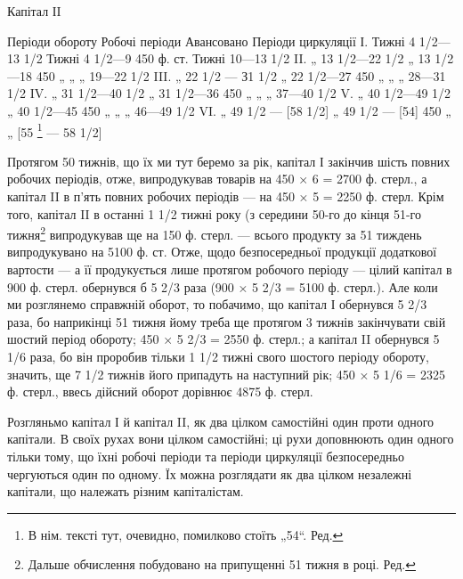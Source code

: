Капітал ІI

Періоди обороту    Робочі періоди    Авансовано    Періоди циркуляції
І. Тижні 4 1/2—13 1/2  Тижні 4 1/2—9    450 ф. ст. Тижні 10—13 1/2
II. „ 13 1/2—22 1/2 „ 13 1/2—18    450 „ „ „ 19—22 1/2
III. „ 22 1/2 — З1 1/2 „ 22 1/2—27    450 „ „ „ 28—31 1/2
IV. „ 31 1/2—40 1/2 „ 31  1/2—36    450 „ „ „ 37—40 1/2
V. „ 40 1/2—49 1/2 „ 40 1/2—45    450 „ „ „ 46—49 1/2
VI. „ 49 1/2 — [58 1/2]  „ 49 1/2 — [54] 450 „ „ [55 \footnote*{
В нім. тексті тут, очевидно, помилково стоїть „54“. Ред.
} — 58 1/2]

Протягом 50 тижнів, що їх ми тут беремо за рік, капітал І закінчив
шість повних робочих періодів, отже, випродукував товарів на 450 × 6
= 2700 ф. стерл., а капітал II в п’ять повних робочих періодів — на
450 × 5 = 2250 ф. стерл. Крім того, капітал II в останні 1 1/2 тижні року
(з середини 50-го до кінця 51-го тижня\footnote*{
Дальше обчислення побудовано на припущенні 51 тижня в році. Ред.
} випродукував ще на 150 ф.
стерл. — всього продукту за 51 тиждень випродукувано на 5100 ф. ст.
Отже, щодо безпосередньої продукції додаткової вартости — а її продукується
лише протягом робочого періоду — цілий капітал в 900 ф. стерл. обернувся
б 5 2/3 раза (900 × 5 2/3 = 5100 ф. стерл.). Але коли ми розглянемо
справжній оборот, то побачимо, що капітал І обернувся 5 2/3 раза, бо
наприкінці 51 тижня йому треба ще протягом 3 тижнів закінчувати
свій шостий період обороту; 450 × 5 2/3 = 2550 ф. стерл.; а капітал
II обернувся 5 1/6 раза, бо він проробив тільки 1 1/2 тижні свого
шостого періоду обороту, значить, ще 7 1/2 тижнів його припадуть на
наступний рік; 450 × 5 1/6 = 2325 ф. стерл., ввесь дійсний оборот дорівнює
4875 ф. стерл.

Розгляньмо капітал І й капітал II, як два цілком самостійні один проти
одного капітали. В своїх рухах вони цілком самостійні; ці рухи доповнюють
один одного тільки тому, що їхні робочі періоди та періоди
циркуляції безпосередньо чергуються один по одному. Їх можна розглядати
як два цілком незалежні капітали, що належать різним капіталістам.

